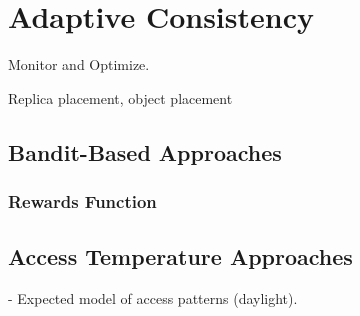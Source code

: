 
\renewcommand{\thechapter}{6}


\chapter{Adaptive Consistency}

Monitor and Optimize.

Replica placement, object placement

\section{Bandit-Based Approaches}

\subsection{Rewards Function}

\section{Access Temperature Approaches}

- Expected model of access patterns (daylight).
